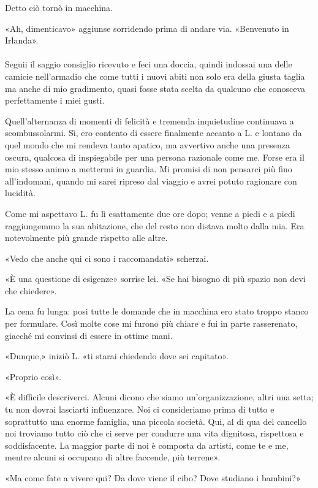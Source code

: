\documentclass[a4paper,12pt]{book}
\begin{document}
Detto ciò tornò in macchina.

«Ah, dimenticavo» aggiunse sorridendo prima di andare via. «Benvenuto in
Irlanda».

\paragraph{}
Seguii il saggio consiglio ricevuto e feci una doccia, quindi indossai una delle
camicie nell'armadio che come tutti i nuovi abiti non solo era della giusta
taglia ma anche di mio gradimento, quasi fosse stata scelta da qualcuno che
conosceva perfettamente i miei gusti.

Quell'alternanza di momenti di felicità e tremenda inquietudine continuava a
scombussolarmi. Sì, ero contento di essere finalmente accanto a L. e lontano da
quel mondo che mi rendeva tanto apatico, ma avvertivo anche una presenza oscura,
qualcosa di inspiegabile per una persona razionale come me. Forse era il mio
stesso animo a mettermi in guardia. Mi promisi di non pensarci più fino
all'indomani, quando mi sarei ripreso dal viaggio e avrei potuto ragionare con
lucidità.

Come mi aspettavo L. fu lì esattamente due ore dopo; venne a piedi e a piedi
raggiungemmo la sua abitazione, che del resto non distava molto dalla mia. Era
notevolmente più grande rispetto alle altre.

«Vedo che anche qui ci sono i raccomandati» scherzai.

«È una questione di esigenze» sorrise lei. «Se hai bisogno di più spazio non
devi che chiedere».

La cena fu lunga: posi tutte le domande che in macchina ero stato troppo stanco
per formulare. Così molte cose mi furono più chiare e fui in parte rasserenato,
giacché mi convinsi di essere in ottime mani.

«Dunque,» iniziò L. «ti starai chiedendo dove sei capitato».

«Proprio così».

«È difficile descriverci. Alcuni dicono che siamo un'organizzazione, altri una
setta; tu non dovrai lasciarti influenzare. Noi ci consideriamo prima di tutto
e soprattutto una enorme famiglia, una piccola società. Qui, al di qua del
cancello noi troviamo tutto ciò che ci serve per condurre una vita dignitosa,
rispettosa e soddisfacente. La maggior parte di noi è composta da artisti, come
te e me, mentre alcuni si occupano di altre faccende, più terrene».

«Ma come fate a vivere qui? Da dove viene il cibo? Dove studiano i bambini?»
\end{document}
